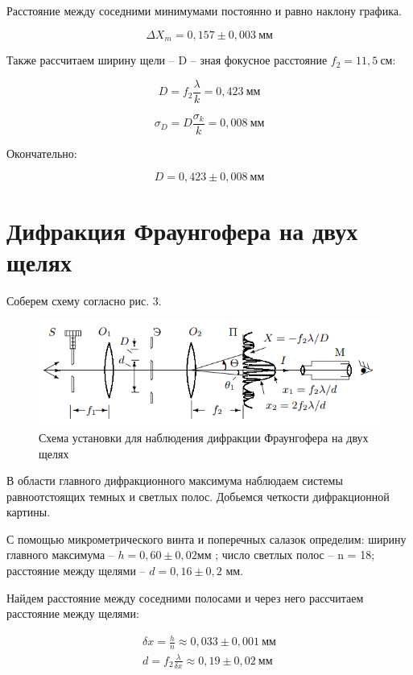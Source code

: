 \documentclass[a4paper,12pt]{article}
\begin{document}
Расстояние между соседними минимумами постоянно и равно наклону графика. 

$$
\Delta X_m = 0,157 \pm 0,003 \ мм
$$

Также рассчитаем ширину щели -- D -- зная фокусное расстояние $f_2 = 11,5 \ см $:

$$
D = f_2 \frac{\lambda}{k} = 0,423 \ мм
$$

$$
\sigma_D = D \frac{\sigma_k}{k} = 0,008 \ мм
$$

Окончательно:

$$
D = 0,423 \pm 0,008 \ мм
$$

\newpage

\section*{Дифракция Фраунгофера на двух щелях}

Соберем схему согласно рис. 3. 

\begin{figure}[h!]
	\begin{center}
    		\includegraphics[scale = 1]{fig3}
    		\caption{Схема установки для наблюдения дифракции Фраунгофера на двух щелях}
	\end{center}
\end{figure}

В области главного дифракционного максимума наблюдаем системы равноотстоящих темных и светлых полос. Добьемся четкости дифракционной картины.

С помощью микрометрического винта и поперечных салазок определим: ширину главного максимума -- $h = 0,60 \pm 0,02$мм ; число светлых полос -- n = 18; расстояние между щелями  -- $d = 0,16 \pm 0,2$ мм.

Найдем расстояние между соседними полосами и через него рассчитаем расстояние между щелями:

\begin{gather*}
\delta x = \frac{h}{n} \approx 0,033 \pm 0,001 \ мм \\
%
d = f_2 \frac{\lambda}{\delta x} \approx 0,19 \pm 0,02 \  мм
\end{gather*}
\end{document}
